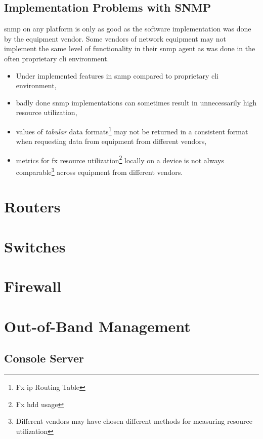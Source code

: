 \subsection{Implementation Problems with SNMP}

\gls{snmp} on any platform is only as good as the software implementation was done by the equipment vendor. Some vendors of network equipment may not implement the same level of functionality in their \gls{snmp} agent as was done in the often proprietary \gls{cli} environment.\cite{wiki:Simple_Network_Management_Protocol}

\begin{itemize}
	\item Under implemented  features in \gls{snmp} compared to proprietary \gls{cli} environment,
	\item badly done \gls{snmp} implementations can sometimes result in unnecessarily high resource utilization,
	\item values of \textit{tabular} data formats\footnote{Fx \gls{ip} Routing Table} may not be returned in a consistent format when requesting data from equipment from different vendors,
	\item metrics for fx resource utilization\footnote{Fx hdd usage} locally on a device is not always comparable\footnote{Different vendors may have chosen different methods for measuring resource utilization} across equipment from different vendors.
\end{itemize}

\section{Routers}

\section{Switches}

\section{Firewall}

\section[OOB Mgmt]{Out-of-Band Management}

\subsection{Console Server}

